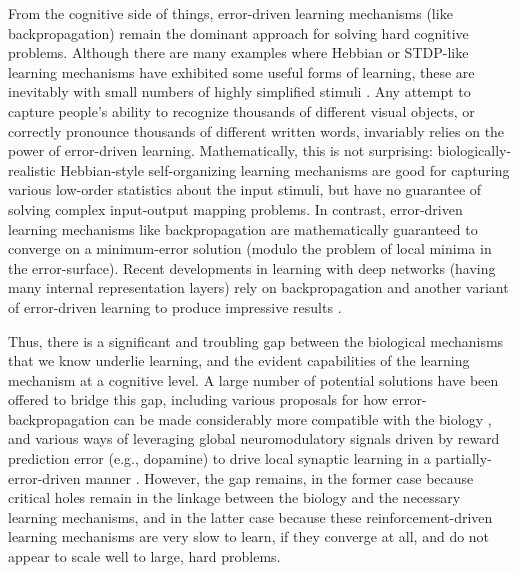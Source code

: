 \documentclass[11pt,twoside]{article}
\begin{document}
From the cognitive side of things, error-driven learning mechanisms (like
backpropagation) remain the dominant approach for solving hard cognitive
problems.  Although there are many examples where Hebbian or STDP-like
learning mechanisms have exhibited some useful forms of learning, these are
inevitably with small numbers of highly simplified stimuli
\cite{RollsDeco,Thorpe,McClelland}.  Any attempt to capture people's ability
to recognize thousands of different visual objects, or correctly pronounce
thousands of different written words, invariably relies on the power of
error-driven learning.  Mathematically, this is not surprising:
biologically-realistic Hebbian-style self-organizing learning mechanisms are
good for capturing various low-order statistics about the input stimuli, but
have no guarantee of solving complex input-output mapping problems.  In
contrast, error-driven learning mechanisms like backpropagation are
mathematically guaranteed to converge on a minimum-error solution (modulo the
problem of local minima in the error-surface).  Recent developments in
learning with deep networks (having many internal representation layers) rely
on backpropagation and another variant of error-driven learning to produce
impressive results \cite{HintonSciPaper}.

Thus, there is a significant and troubling gap between the biological
mechanisms that we know underlie learning, and the evident capabilities of the
learning mechanism at a cognitive level.  A large number of potential
solutions have been offered to bridge this gap, including various proposals
for how error-backpropagation can be made considerably more compatible with
the biology \cite{OReilly96,OReillyMunakata00,XieSeung??}, and various ways of
leveraging global neuromodulatory signals driven by reward prediction error
(e.g., dopamine) to drive local synaptic learning in a partially-error-driven
manner \cite{MazzoniAndersonEtc}.  However, the gap remains, in the former
case because critical holes remain in the linkage between the biology and the
necessary learning mechanisms, and in the latter case because these
reinforcement-driven learning mechanisms are very slow to learn, if they
converge at all, and do not appear to scale well to large, hard problems.
\end{document}
